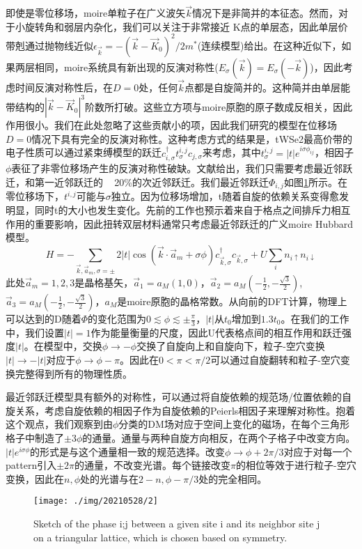 \documentclass[reprint, aps, prb, showkeys]{revtex4-2}
\begin{document}
即使是零位移场，moire单粒子在广义波矢$\vec{k}$情况下是非简并的本征态。然而，对于小旋转角和弱层内杂化，我们可以关注于非常接近 K点的单层态，因此单层价带剋通过抛物线近似$\epsilon_{\vec{k}} = -(\vec{k} - \vec{K}_0)^2 /2m^{*}$(连续模型)给出。在这种近似下，如果两层相同，moire系统具有新出现的反演对称性($E_{\sigma}(\vec{k}) = E_{\sigma}(-\vec{k})$)，因此考虑时间反演对称性后，在$D = 0$处，任何$\vec{k}$点都是自旋简并的。这种简并由单层能带结构的$\left\lvert \vec{k} - \vec{K}_0 \right\rvert^3$阶数所打破。这些立方项与moire原胞的原子数成反相关，因此作用很小。我们在此处忽略了这些贡献小的项，因此我们研究的模型在位移场$D = 0$情况下具有完全的反演对称性。这种考虑方式的结果是，tWSe2最高价带的电子性质可以通过紧束缚模型的跃迁$c_{i,\sigma}^{\dagger} t_{\sigma}^{i, j} c_{j, \sigma}$来考虑，其中$t_{\sigma}^{i, j} = | t | e^{i \sigma \phi_{i j}}$，相因子$\phi$表征了非零位移场产生的反演对称性破缺。文献给出，我们只需要考虑最近邻跃迁，和第一近邻跃迁的 ~ 20\%的次近邻跃迁。我们最近邻跃迁$\Phi_{i, j}$如图\ref{fig:neighbor}所示。在零位移场下，$t^{i, j}$可能与$\sigma$独立。因为位移场增加，t随着自旋的依赖关系变得愈发明显，同时t的大小也发生变化。先前的工作也预示着来自于格点之间排斥力相互作用的重要影响，因此扭转双层材料通常只考虑最近邻跃迁的广义moire Hubbard模型。
\begin{equation}
    H = -\sum_{\vec{k}, \vec{a}_m, \sigma = \pm} 2 |t| \cos(\vec{k} \cdot \vec{a}_m + \sigma \phi)c_{\vec{k}, \sigma}^{\dagger} c_{\vec{k}, \sigma} + U \sum_i n_{i \uparrow} n_{i \downarrow}
\end{equation}
此处$\vec{a}_m = 1, 2, 3$是晶格基矢，$\vec{a}_1 = a_M(1, 0)$，$\vec{a}_2 = a_M(- \frac{1}{2}, -\frac{\sqrt{3}}{2})$, $\vec{a}_3 = a_M(- \frac{1}{2}, - \frac{\sqrt{3}}{2})$，$a_M$是moire原胞的晶格常数。从向前的DFT计算，物理上可以达到的D随着$\Phi$的变化范围为$0 \lesssim \phi \lesssim \pm \frac{\pi}{3}$，$|t|$从$t_0$增加到$1.3 t_0$。在我们的工作中，我们设置$|t| = 1$作为能量衡量的尺度，因此U代表格点间的相互作用和跃迁强度$|t|$。在模型中，交换$\phi \rightarrow -\phi$交换了自旋向上和自旋向下，粒子-空穴变换$|t| \rightarrow -|t|$对应于$\phi \rightarrow \phi - \pi$。因此在$0 < \pi < \pi /2$可以通过自旋翻转和粒子-空穴变换完整得到所有的物理性质。

最近邻跃迁模型具有额外的对称性，可以通过将自旋依赖的规范场/位置依赖的自旋关系，考虑自旋依赖的相因子作为自旋依赖的Peierls相因子来理解对称性。抱着这个观点，我们观察到由$\phi$分类的DM场对应于空间上变化的磁场，在每个三角形格子中制造了$\pm 3\phi$的通量。通量与两种自旋方向相反，在两个子格子中改变方向。$|t|e^{i \sigma \phi}$的形式是与这个通量相一致的规范选择。改变$\phi \rightarrow \phi + 2\pi/3$对应于对每一个pattern引入$\pm 2\pi$的通量，不改变光谱。每个链接改变$\pi$的相位等效于进行粒子-空穴变换，因此在$n, \phi$处的光谱与在$2-n, \phi - \pi/3$处的完全相同。
\begin{figure}[b]
    \texttt{[image: ./img/20210528/2]}
    \caption{\label{fig:neighbor} 
    Sketch of the phase i;j between a given site i and its neighbor site j on a triangular lattice, which is chosen based on symmetry.
    }
\end{figure}
\end{document}
